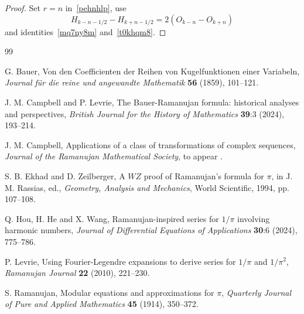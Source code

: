 \documentclass[12pt,reqno]{article}
\begin{document}
\begin{proof}
Set $r=n$ in~\eqref{pehnhlp}, use
\begin{equation*}
H_{k - n - 1/2}  - H_{k + n - 1/2}  = 2\left( {O_{k - n}  - O_{k + n} } \right)
\end{equation*}
and identities~\eqref{mq7ny8m} and~\eqref{t0khqm8}.
\end{proof}
\begin{thebibliography}{99}

 G. Bauer, Von den Coefficienten der Reihen von Kugelfunktionen einer Variabeln, \emph{Journal f\"ur die reine und angewandte Mathematik} {\bf 56} (1859), 101--121.

 J. M. Campbell and P. Levrie, The Bauer-Ramanujan formula: historical analyses and perspectives, \emph{British Journal for the History of Mathematics} {\bf 39}:3 (2024), 193--214.

 J. M. Campbell, Applications of a class of transformations of complex sequences, \emph{Journal of the Ramanujan Mathematical Society}, to appear .

 S. B. Ekhad and D. Zeilberger, A $WZ$ proof of Ramanujan's formula for $\pi$, in J. M. Rassias, ed., \emph{Geometry, Analysis and Mechanics}, World Scientific, 1994, pp. 107--108.

 Q. Hou, H. He and X. Wang, Ramanujan-inspired series for $1/\pi$ involving harmonic numbers, \emph{Journal of Differential Equations of Applications} {\bf 30}:6 (2024), 775--786.

 P. Levrie, Using Fourier-Legendre expansions to derive series for $1/\pi$ and $1/\pi^2$, \emph{Ramanujan Journal} {\bf 22} (2010), 221--230.

 S. Ramanujan, Modular equations and approximations for $\pi$, \emph{Quarterly Journal of Pure and Applied Mathematics} {\bf 45} (1914), 350--372.

\end{thebibliography}
\end{document}
